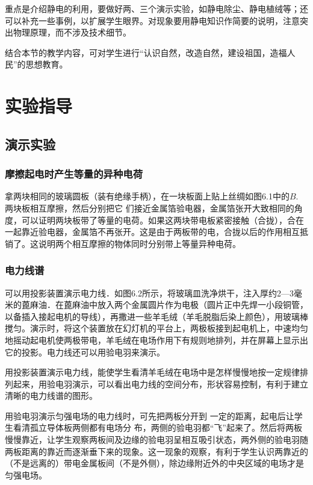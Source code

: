 重点是介绍静电的利用，要做好两、三个演示实验，如静电除尘、静电植绒等；还可以补充一些事例，以扩展学生眼界。对现象要用静电知识作简要的说明，注意突出物理原理，而不涉及技术细节。

结合本节的教学内容，可对学生进行“认识自然，改造自然，建设祖国，造福人民”的思想教育。

\section{实验指导}
\subsection{演示实验}
\subsubsection{摩擦起电时产生等量的异种电荷}

拿两块相同的玻璃圆板（装有绝缘手柄），在一块板面上贴上丝绸如图6.1中的$B$. 两块板相互摩擦，然后分别把它
们接近金属箔验电器，金属箔张开大致相同的角度，可以证明两块板带了等量的电荷。如果这两块带电板紧密接触（合拢），合在一起靠近验电器，金属箔不再张开。这是由于两板带的电，合拢以后的作用相互抵销了。这说明两个相互摩擦的物体同时分别带上等量异种电荷。

\begin{figure}[htp]
    \centering
    \caption{}
\end{figure}

\subsubsection{电力线谱}

可以用投影装置演示电力线．如图6.2所示，将玻璃皿洗净烘干，注入厚约2—3毫米的蓖麻油．在蓖麻油中放入两个金属圆片作为电极（圆片正中先焊一小段铜管，以备插入接起电机的导线），再撒进一些羊毛绒（羊毛脱脂后染上颜色），用玻璃棒搅匀。演示时，将这个装置放在幻灯机的平台上，两极板接到起电机上，中速均匀地摇动起电机使两极带电，羊毛绒在电场作用下有规则地排列，并在屏幕上显示出它的投影。电力线还可以用验电羽来演示。

用投影装置演示电力线，能使学生看清羊毛绒在电场中是怎样慢慢地按一定规律排列起来，用验电羽演示，可以看出电力线的空间分布，形状容易控制，有利于建立清晰的电力线谱的图形。

用验电羽演示匀强电场的电力线时，可先把两板分开到
一定的距离，起电后让学生看清孤立导体板两侧都有电场分
布，两侧的验电羽都“飞”起来了。然后将两板慢慢靠近，让学生观察两板间及边缘的验电羽呈相互吸引状态，两外侧的验电羽随两板距离的靠近而逐渐垂下来的现象。这一现象的观察，有利于学生认识两靠近的（不是远离的）带电金属板间（不是外侧），除边缘附近外的中央区域的电场才是匀强电场。

